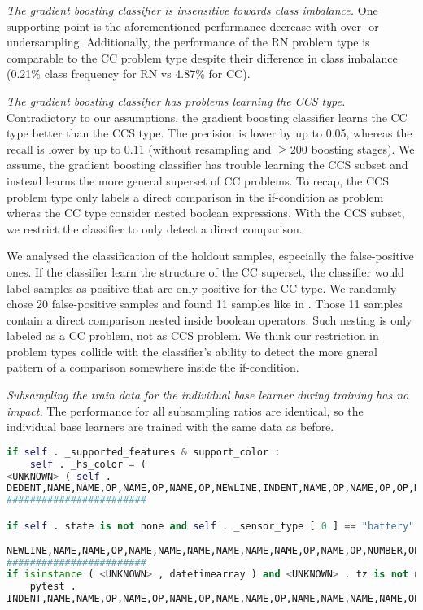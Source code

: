 \textit{The gradient boosting classifier is insensitive towards class imbalance.} One supporting point is the aforementioned performance decrease with over- or undersampling. Additionally, the performance of the RN problem type is comparable to the CC problem type despite their difference in class imbalance (0.21\% class frequency for RN vs 4.87\% for CC). 

\textit{The gradient boosting classifier has problems learning the CCS type.} Contradictory to our assumptions, the gradient boosting classifier learns the CC type better than the CCS type. The precision is lower by up to 0.05, whereas the recall is lower by up to 0.11 (without resampling and $\geq 200$ boosting stages). We assume, the gradient boosting classifier has trouble learning the CCS subset and instead learns the more general superset of CC problems. To recap, the CCS problem type only labels a direct comparison in the if-condition as problem wheras the CC type consider nested boolean expressions. With the CCS subset, we restrict the classifier to only detect a direct comparison. 

We analysed the classification of the holdout samples, especially the false-positive ones. If the classifier learn the structure of the CC superset, the classifier would label samples as positive that are only positive for the CC type. We randomly chose 20 false-positive samples and found 11 samples like in . Those 11 samples contain a direct comparison nested inside boolean operators. Such nesting is only labeled as a CC problem, not as CCS problem. We think our restriction in problem types collide with the classifier's ability to detect the more gneral pattern of a comparison somewhere inside the if-condition.


\textit{Subsampling the train data for the individual base learner during training has no impact.} The performance for all subsampling ratios are identical, so the individual base learners are trained with the same data as before.


\begin{lstlisting}[float=h, language=Python, label=lst:gbc_false_positive, caption={False-positive samples for the best performing random forest classifier with 300 boosting stages, a learning rate of 0.2, type encoding and without resampling for the CCS type. We removed spaces between tokens if necessary, but leave the intendation as in the sample.}]
    if self . _supported_features & support_color : 
    self . _hs_color = ( 
<UNKNOWN> ( self .
DEDENT,NAME,NAME,OP,NAME,OP,NAME,OP,NEWLINE,INDENT,NAME,OP,NAME,OP,OP,NL,NAME,OP,NAME,OP
########################

if self . state is not none and self . _sensor_type [ 0 ] == "battery" : 
   
NEWLINE,NAME,NAME,OP,NAME,NAME,NAME,NAME,NAME,NAME,OP,NAME,OP,NUMBER,OP,OP,STRING,OP,NEWLINE,INDENT
########################
if isinstance ( <UNKNOWN> , datetimearray ) and <UNKNOWN> . tz is not none : 
    pytest .
INDENT,NAME,NAME,OP,NAME,OP,NAME,OP,NAME,NAME,OP,NAME,NAME,NAME,NAME,OP,NEWLINE,INDENT,NAME,OP
\end{lstlisting}

